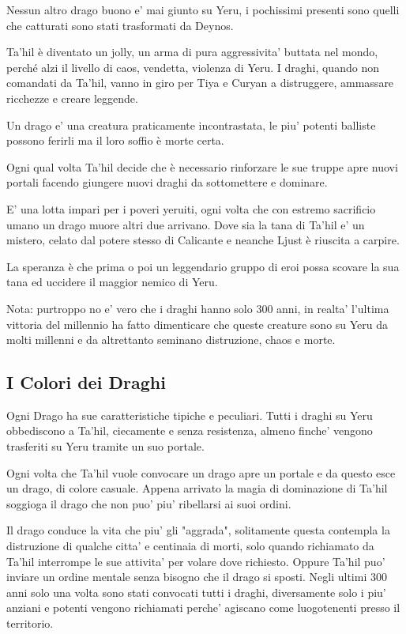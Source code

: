 \documentclass[a4paper,11pt,twoside,openany]{book}
\begin{document}
Nessun altro drago buono e' mai giunto su Yeru, i pochissimi presenti sono quelli che catturati sono stati trasformati da Deynos.

Ta'hil è diventato un jolly, un arma di pura aggressivita' buttata nel mondo, perché alzi il livello di caos, vendetta, violenza di Yeru.
I draghi, quando non comandati da Ta'hil, vanno in giro per Tiya e Curyan a distruggere, ammassare ricchezze e creare leggende.

Un drago e' una creatura praticamente incontrastata, le piu' potenti balliste possono ferirli ma il loro soffio è morte certa.

Ogni qual volta Ta'hil decide che è necessario rinforzare le sue truppe apre nuovi portali facendo giungere nuovi draghi da sottomettere e dominare.

E' una lotta impari per i poveri yeruiti, ogni volta che con estremo sacrificio umano un drago muore altri due arrivano. Dove sia la tana di Ta'hil e' un mistero, celato dal potere stesso di  Calicante e neanche Ljust è riuscita a carpire.

La speranza è che prima o poi un leggendario gruppo di eroi possa scovare la sua tana ed uccidere il maggior nemico di Yeru.

Nota: purtroppo no e' vero che i draghi hanno solo 300 anni, in realta' l'ultima vittoria del millennio ha fatto dimenticare che queste creature sono su Yeru da molti millenni e da altrettanto seminano distruzione, chaos e morte.

\subsection{I Colori dei Draghi}

Ogni Drago ha sue caratteristiche tipiche e peculiari.
Tutti i draghi su Yeru obbediscono a Ta'hil, ciecamente e senza resistenza, almeno finche' vengono trasferiti su Yeru tramite un suo portale.

Ogni volta che Ta'hil vuole convocare un drago apre un portale e da questo esce un drago, di colore casuale. Appena arrivato la magia di dominazione di Ta'hil soggioga il drago che non puo' piu' ribellarsi ai suoi ordini.

Il drago conduce la vita che piu' gli "aggrada", solitamente questa contempla la distruzione di qualche citta' e centinaia di morti, solo quando richiamato da Ta'hil interrompe le sue attivita' per volare dove richiesto. Oppure Ta'hil puo' inviare un ordine mentale senza bisogno che il drago si sposti.
Negli ultimi 300 anni solo una volta sono stati convocati tutti i draghi, diversamente solo i piu' anziani e potenti vengono richiamati perche' agiscano come luogotenenti presso il territorio.
\end{document}
